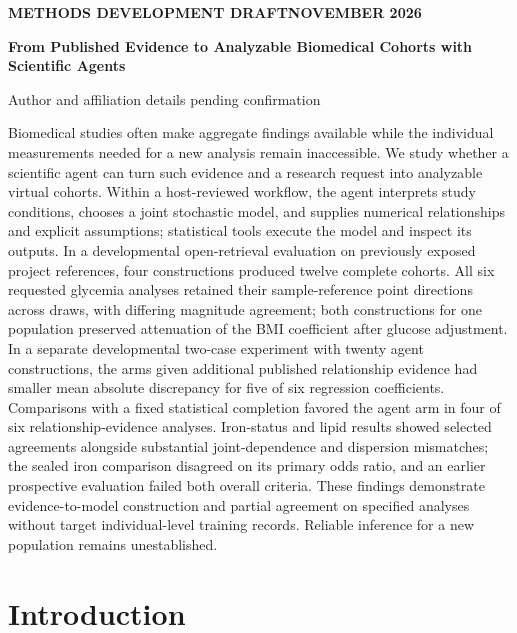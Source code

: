 \documentclass[11pt,letterpaper]{article}
\renewenvironment{abstract}{\small\par\noindent{\sffamily\bfseries\color{ink}Abstract}\quad\ignorespaces}{\par\medskip}
\begin{document}
\thispagestyle{plain}
{\sffamily\footnotesize\color{accent}\bfseries METHODS DEVELOPMENT DRAFT\quad\textbar\quad NOVEMBER 2026\par}
\vspace{.7em}
{\raggedright\sffamily\bfseries\fontsize{24}{29}\selectfont\color{ink}From Published Evidence to Analyzable Biomedical Cohorts with Scientific Agents\par}
\vspace{.5em}
{\small Author and affiliation details pending confirmation\par}
\vspace{.7em}
\begin{abstract}

Biomedical studies often make aggregate findings available while the individual measurements needed for a new analysis remain inaccessible. We study whether a scientific agent can turn such evidence and a research request into analyzable virtual cohorts. Within a host-reviewed workflow, the agent interprets study conditions, chooses a joint stochastic model, and supplies numerical relationships and explicit assumptions; statistical tools execute the model and inspect its outputs. In a developmental open-retrieval evaluation on previously exposed project references, four constructions produced twelve complete cohorts. All six requested glycemia analyses retained their sample-reference point directions across draws, with differing magnitude agreement; both constructions for one population preserved attenuation of the BMI coefficient after glucose adjustment. In a separate developmental two-case experiment with twenty agent constructions, the arms given additional published relationship evidence had smaller mean absolute discrepancy for five of six regression coefficients. Comparisons with a fixed statistical completion favored the agent arm in four of six relationship-evidence analyses. Iron-status and lipid results showed selected agreements alongside substantial joint-dependence and dispersion mismatches; the sealed iron comparison disagreed on its primary odds ratio, and an earlier prospective evaluation failed both overall criteria. These findings demonstrate evidence-to-model construction and partial agreement on specified analyses without target individual-level training records. Reliable inference for a new population remains unestablished.

\end{abstract}

\section{Introduction}
\end{document}
